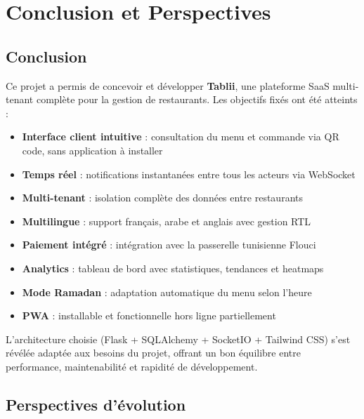 \documentclass[12pt,a4paper]{report}
\begin{document}
\cleardoublepage

\chapter*{Conclusion et Perspectives}

\section*{Conclusion}

Ce projet a permis de concevoir et développer \textbf{Tablii}, une plateforme SaaS multi-tenant complète pour la gestion de restaurants. Les objectifs fixés ont été atteints :

\begin{itemize}
    \item \textbf{Interface client intuitive} : consultation du menu et commande via QR code, sans application à installer
    \item \textbf{Temps réel} : notifications instantanées entre tous les acteurs via WebSocket
    \item \textbf{Multi-tenant} : isolation complète des données entre restaurants
    \item \textbf{Multilingue} : support français, arabe et anglais avec gestion RTL
    \item \textbf{Paiement intégré} : intégration avec la passerelle tunisienne Flouci
    \item \textbf{Analytics} : tableau de bord avec statistiques, tendances et heatmaps
    \item \textbf{Mode Ramadan} : adaptation automatique du menu selon l'heure
    \item \textbf{PWA} : installable et fonctionnelle hors ligne partiellement
\end{itemize}

L'architecture choisie (Flask + SQLAlchemy + SocketIO + Tailwind CSS) s'est révélée adaptée aux besoins du projet, offrant un bon équilibre entre performance, maintenabilité et rapidité de développement.

\section*{Perspectives d'évolution}
\end{document}
